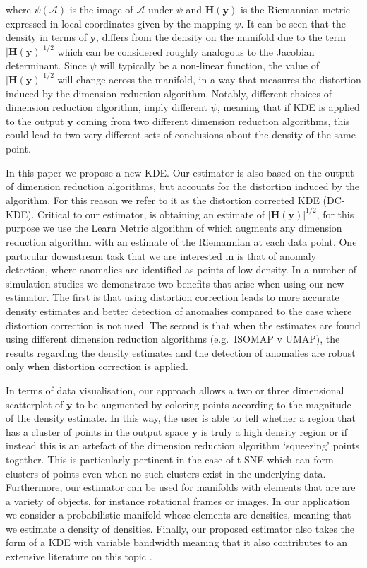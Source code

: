 \documentclass[11pt,a4paper,]{article}
\begin{document}
where \(\psi(\mathcal{A})\) is the image of \(\mathcal{A}\) under \(\psi\) and \(\pmb{H}(\pmb{y})\) is the Riemannian metric expressed in local coordinates given by the mapping \(\psi\). It can be seen that the density in terms of \(\pmb{y}\), differs from the density on the manifold due to the term \(|\pmb{H}(\pmb{y})|^{1/2}\) which can be considered roughly analogous to the Jacobian determinant. Since \(\psi\) will typically be a non-linear function, the value of \(|\pmb{H}(\pmb{y})|^{1/2}\) will change across the manifold, in a way that measures the distortion induced by the dimension reduction algorithm. Notably, different choices of dimension reduction algorithm, imply different \(\psi\), meaning that if KDE is applied to the output \(\pmb{y}\) coming from two different dimension reduction algorithms, this could lead to two very different sets of conclusions about the density of the same point.

In this paper we propose a new KDE. Our estimator is also based on the output of dimension reduction algorithms, but accounts for the distortion induced by the algorithm. For this reason we refer to it as the distortion corrected KDE (DC-KDE). Critical to our estimator, is obtaining an estimate of \(|\pmb{H}(\pmb{y})|^{1/2}\), for this purpose we use the Learn Metric algorithm of \textcite{Perrault-Joncas2013-pq} which augments any dimension reduction algorithm with an estimate of the Riemannian at each data point. One particular downstream task that we are interested in is that of anomaly detection, where anomalies are identified as points of low density. In a number of simulation studies we demonstrate two benefits that arise when using our new estimator. The first is that using distortion correction leads to more accurate density estimates and better detection of anomalies compared to the case where distortion correction is not used. The second is that when the estimates are found using different dimension reduction algorithms (e.g.~ISOMAP v UMAP), the results regarding the density estimates and the detection of anomalies are robust only when distortion correction is applied.

In terms of data visualisation, our approach allows a two or three dimensional scatterplot of \(\pmb{y}\) to be augmented by coloring points according to the magnitude of the density estimate. In this way, the user is able to tell whether a region that has a cluster of points in the output space \(\pmb{y}\) is truly a high density region or if instead this is an artefact of the dimension reduction algorithm `squeezing' points together. This is particularly pertinent in the case of t-SNE which can form clusters of points even when no such clusters exist in the underlying data. Furthermore, our estimator can be used for manifolds with elements that are are a variety of objects, for instance rotational frames or images. In our application we consider a probabilistic manifold whose elements are densities, meaning that we estimate a density of densities. Finally, our proposed estimator also takes the form of a KDE with variable bandwidth meaning that it also contributes to an extensive literature on this topic \autocite[see Section 6.6 of][ for a summary]{Scott2015-vl}.
\end{document}
